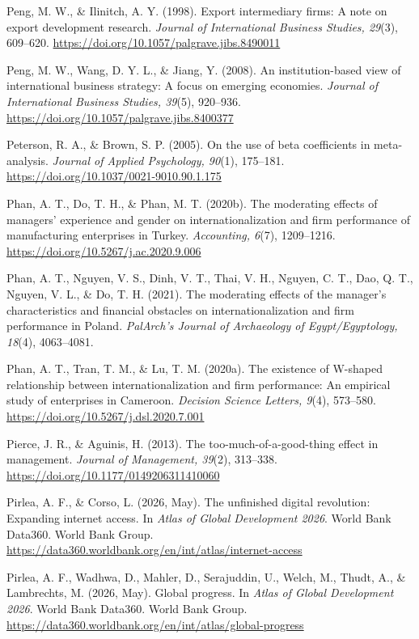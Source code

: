 \documentclass[
  a4paper,
  13pt]{extreport}
\begin{document}
Peng, M. W., \& Ilinitch, A. Y. (1998). Export intermediary firms: A
note on export development research. \emph{Journal of International
Business Studies, 29}(3), 609--620.
\url{https://doi.org/10.1057/palgrave.jibs.8490011}

Peng, M. W., Wang, D. Y. L., \& Jiang, Y. (2008). An institution-based
view of international business strategy: A focus on emerging economies.
\emph{Journal of International Business Studies, 39}(5), 920--936.
\url{https://doi.org/10.1057/palgrave.jibs.8400377}

Peterson, R. A., \& Brown, S. P. (2005). On the use of beta coefficients
in meta-analysis. \emph{Journal of Applied Psychology, 90}(1), 175--181.
\url{https://doi.org/10.1037/0021-9010.90.1.175}

Phan, A. T., Do, T. H., \& Phan, M. T. (2020b). The moderating effects
of managers' experience and gender on internationalization and firm
performance of manufacturing enterprises in Turkey. \emph{Accounting,
6}(7), 1209--1216. \url{https://doi.org/10.5267/j.ac.2020.9.006}

Phan, A. T., Nguyen, V. S., Dinh, V. T., Thai, V. H., Nguyen, C. T.,
Dao, Q. T., Nguyen, V. L., \& Do, T. H. (2021). The moderating effects
of the manager's characteristics and financial obstacles on
internationalization and firm performance in Poland. \emph{PalArch's
Journal of Archaeology of Egypt/Egyptology, 18}(4), 4063--4081.

Phan, A. T., Tran, T. M., \& Lu, T. M. (2020a). The existence of
W-shaped relationship between internationalization and firm performance:
An empirical study of enterprises in Cameroon. \emph{Decision Science
Letters, 9}(4), 573--580. \url{https://doi.org/10.5267/j.dsl.2020.7.001}

Pierce, J. R., \& Aguinis, H. (2013). The too-much-of-a-good-thing
effect in management. \emph{Journal of Management, 39}(2), 313--338.
\url{https://doi.org/10.1177/0149206311410060}

Pirlea, A. F., \& Corso, L. (2026, May). The unfinished digital
revolution: Expanding internet access. In \emph{Atlas of Global
Development 2026}. World Bank Data360. World Bank Group.
\url{https://data360.worldbank.org/en/int/atlas/internet-access}

Pirlea, A. F., Wadhwa, D., Mahler, D., Serajuddin, U., Welch, M., Thudt,
A., \& Lambrechts, M. (2026, May). Global progress. In \emph{Atlas of
Global Development 2026}. World Bank Data360. World Bank Group.
\url{https://data360.worldbank.org/en/int/atlas/global-progress}
\end{document}
